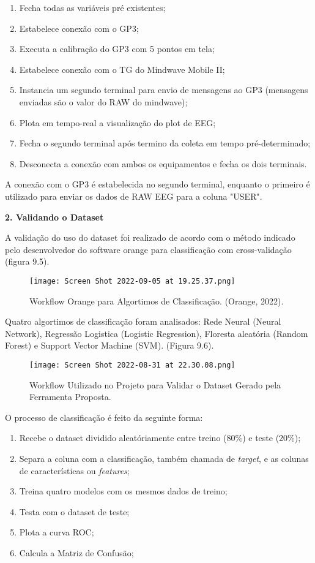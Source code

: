 \begin{enumerate}
    \item Fecha todas as variáveis pré existentes;
    \item Estabelece conexão com o GP3;
    \item Executa a calibração do GP3 com 5 pontos em tela;
    \item Estabelece conexão com o TG do Mindwave Mobile II;
    \item Instancia um segundo terminal para envio de mensagens ao GP3 (mensagens enviadas são o valor do RAW do mindwave);
    \item Plota em tempo-real a visualização do plot de EEG;
    \item Fecha o segundo terminal após termino da coleta em tempo pré-determinado;
    \item Desconecta a conexão com ambos os equipamentos e fecha os dois terminais.
\end{enumerate}

 A conexão com o GP3 é estabelecida no segundo terminal, enquanto o primeiro é utilizado para enviar os dados 
    de RAW EEG para a coluna "USER". 



 \textbf{2. Validando o Dataset}

A validação do uso do dataset foi realizado de acordo com o método indicado pelo 
desenvolvedor do software orange para classificação com cross-validação (figura 9.5). 

 \begin{figure}[!h]
    \centering
    \texttt{[image: Screen Shot 2022-09-05 at 19.25.37.png]}
    \caption{Workflow Orange para Algortimos de Classificação. (Orange, 2022).}
\end{figure}

Quatro algortimos de classificação foram
analisados: Rede Neural (Neural Network), Regressão Logistica (Logistic Regression), Floresta aleatória (Random Forest)
e Support Vector Machine (SVM). (Figura 9.6). 

 \begin{figure}[!h]
    \centering
    \texttt{[image: Screen Shot 2022-08-31 at 22.30.08.png]}
    \caption{Workflow Utilizado no Projeto para Validar o Dataset Gerado pela Ferramenta Proposta.}
\end{figure}

O processo de classificação é feito da seguinte forma:

\begin{enumerate}
    \item Recebe o dataset dividido aleatóriamente entre treino (80\%) e teste (20\%);
    \item Separa a coluna com a classificação, também chamada de \textit{target}, e as colunas de características ou \textit{features};
    \item Treina quatro modelos com os mesmos dados de treino;
    \item Testa com o dataset de teste;
    \item Plota a curva ROC;
    \item Calcula a Matriz de Confusão;
\end{enumerate}



